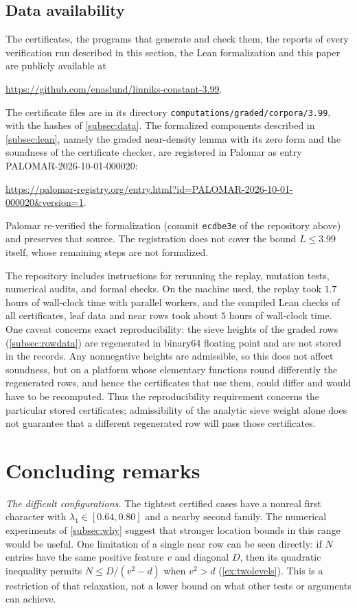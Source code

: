 \documentclass[11pt]{amsart}
\numberwithin{equation}{section}
\theoremstyle{plain}
\theoremstyle{definition}
\theoremstyle{remark}
\newcommand{\1}{\mathbf{1}}
\begin{document}
\subsection{Data availability}
The certificates, the programs that generate and check them, the reports of every
verification run described in this section, the Lean formalization and this paper are publicly
available at
\begin{center}\url{https://github.com/enaslund/linniks-constant-3.99}.\end{center}
The certificate files are in its directory \texttt{computations/graded/corpora/3.99}, with the
hashes of \cref{subsec:data}.
The formalized components described in \cref{subsec:lean}, namely the graded near-density lemma
with its zero form and the soundness of the certificate checker, are registered in Palomar as entry
PALOMAR-2026-10-01-000020:
\begin{center}\url{https://palomar-registry.org/entry.html?id=PALOMAR-2026-10-01-000020&version=1}.\end{center}
Palomar re-verified the formalization (commit \texttt{ecdbe3e} of the repository above) and
preserves that source. The registration does not cover the bound $L\le3.99$ itself, whose
remaining steps are not formalized.

The repository includes instructions for rerunning the replay, mutation tests,
numerical audits, and formal checks. On the machine used,
the replay took $1.7$ hours of wall-clock time with parallel workers, and the compiled Lean checks
of all certificates, leaf data and near rows took about $5$ hours of wall-clock time. One caveat
concerns exact reproducibility: the sieve heights of the graded rows (\cref{subsec:rowdata}) are
regenerated in binary64 floating point and are not stored in the records. Any nonnegative heights
are admissible, so this does not affect soundness, but on a platform whose elementary functions
round differently the regenerated rows, and hence the certificates that use them, could differ and
would have to be recomputed. Thus the reproducibility requirement concerns the
particular stored certificates; admissibility of the analytic sieve weight alone does
not guarantee that a different regenerated row will pass those certificates.

\section{Concluding remarks}\label{sec:remarks}

\emph{The difficult configurations.} The tightest certified cases have a nonreal first
character with $\lambda_1\in[0.64,0.80]$ and a nearby second family. The numerical
experiments of \cref{subsec:why} suggest that stronger location bounds in this range
would be useful. One limitation of a single near row can be seen directly: if $N$
entries have the same positive feature $v$ and diagonal $D$, then its quadratic
inequality permits $N\le D/(v^2-d)$ when $v^2>d$ (\cref{ex:twolevels}). This is a restriction of that
relaxation, not a lower bound on what other tests or arguments can achieve.
\end{document}
